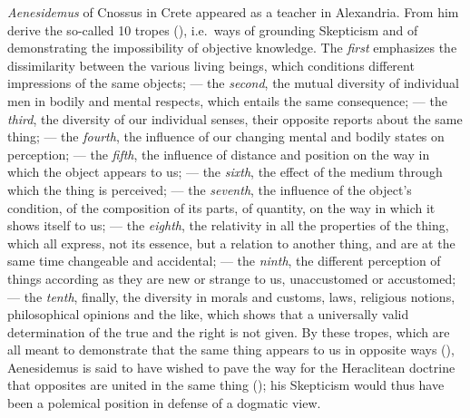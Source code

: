 \emph{Aenesidemus} of Cnossus in Crete appeared as a
teacher in Alexandria. From him derive the so-called 10
tropes (), i.e.\ ways of grounding Skepticism and of demonstrating the impossibility of objective knowledge. The \emph{first} emphasizes the dissimilarity between the various living beings, which
conditions different impressions of the same objects; --- the
\emph{second}, the mutual diversity of individual men in
bodily and mental respects, which entails the same
consequence; --- the \emph{third}, the diversity of our individual senses, their opposite reports about the same thing; --- the
\emph{fourth}, the influence of our changing mental and bodily states on perception; --- the \emph{fifth}, the influence of
distance and position on the way in which the object appears to us; --- the \emph{sixth}, the effect of the medium
through which the thing is perceived; --- the \emph{seventh}, the influence of the object's condition, of the composition of its parts, of quantity, on the way in which it shows itself to us; ---
the \emph{eighth}, the relativity in all the properties of the thing, which all
express, not its essence, but a relation to another thing,
and are at the same time changeable and accidental; --- the \emph{ninth}, the
different perception of things according as they are new or
strange to us, unaccustomed or accustomed; --- the \emph{tenth}, finally, the diversity in morals and customs, laws, religious notions,
philosophical opinions and the like, which shows that a universally valid
determination of the true and the right is not given. By these
tropes, which are all meant to demonstrate that the same thing
appears to us in opposite ways
(), Aenesidemus is said to have wished to pave the way for the
Heraclitean doctrine that opposites are united in the same
thing (); his Skepticism would
thus have been a polemical position in defense of a dogmatic view.

